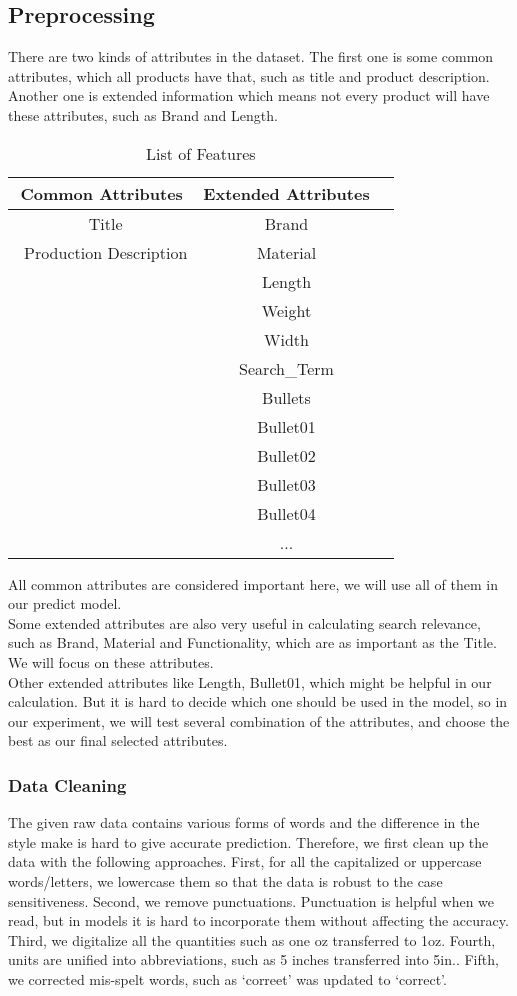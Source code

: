 \documentclass{sig-alternate-05-2015}
\begin{document}
\subsection{Preprocessing}

There are two kinds of attributes in the dataset. The first one is some common attributes, which all products have that, such as title and product description. Another one is extended information which means not every product will have these attributes, such as Brand and Length.
\begin{table}[ht]
\centering
\caption{List of Features}
\begin{tabular}{|c|c|l|} \hline
Common Attributes & Extended Attributes \\\hline
\ Title & Brand\\
\ Production Description & Material \\
\  & Length\\ 
\   & Weight\\ 
\   & Width\\
\   & Search\_Term\\
\   & Bullets \\
\   & Bullet01\\
\   & Bullet02\\
\   & Bullet03\\
\   & Bullet04\\
\  & ... \\ \hline\end{tabular}
\end{table}

All common attributes are considered important here, we will use all of them in our predict model.\\

Some extended attributes are also very useful in calculating search relevance, such as Brand, Material and Functionality, which are as important as the Title. We will focus on these attributes.\\

Other extended attributes like Length, Bullet01, which might be helpful in our calculation. But it is hard to decide which one should be used in the model, so in our experiment, we will test several combination of the attributes, and choose the best as our final selected attributes.

\subsubsection{Data Cleaning}
The given raw data contains various forms of words and the difference in the style make is hard to give accurate prediction. Therefore, we first clean up the data with the following approaches. First, for all the capitalized or uppercase words/letters, we lowercase them so that the data is robust to the case sensitiveness. Second, we remove punctuations. Punctuation is helpful when we read, but in models it is hard to incorporate them without affecting the accuracy. Third, we digitalize all the quantities such as one oz transferred to 1oz. Fourth, units are unified into abbreviations, such as 5 inches transferred into 5in.. Fifth, we corrected mis-spelt words, such as \lq correet' was updated to \lq correct'. 
\end{document}
